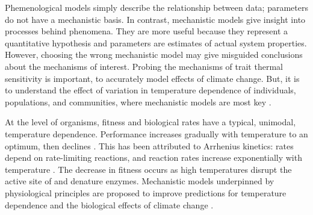 \documentclass[11pt]{article}
\begin{document}
Phemenological models simply describe the relationship between data; parameters do not have a mechanistic basis.
In contrast, mechanistic models give insight into processes behind phenomena.
They are more useful because they represent a quantitative hypothesis and parameters are estimates of actual system properties. However, choosing the wrong mechanistic model may give misguided conclusions about the mechanisms of interest.
Probing the mechanisms of trait thermal sensitivity is important, to accurately model effects of climate change. But, it is to understand the effect of variation in temperature dependence of individuals, populations, and communities, where mechanistic models are most key \cite{Pawar2016}.

At the level of organisms, fitness and biological rates have a typical, unimodal, temperature dependence. Performance increases gradually with temperature to an optimum, then declines \cite{Gillooly2001, Knies2010}.
This has been attributed to Arrhenius kinetics: rates depend on rate-limiting reactions, and reaction rates increase exponentially with temperature \cite{SchoolfieldSharpe1981 cited Arrhenius 1915}.
The decrease in fitness occurs as high temperatures disrupt the active site of and denature enzymes.
Mechanistic models underpinned by physiological principles are proposed to improve predictions for temperature dependence and the biological effects of climate change
\cite{Dell2011, Gilbert2015}.

\end{document}

